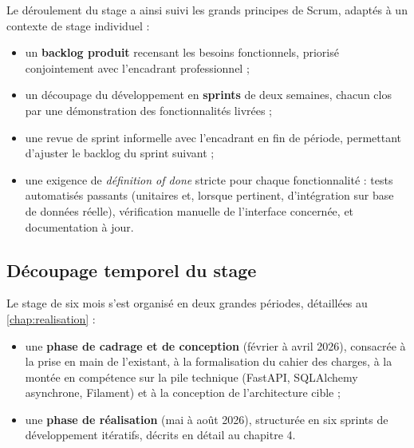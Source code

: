 Le déroulement du stage a ainsi suivi les grands principes de Scrum, adaptés à un contexte de stage individuel :

\begin{itemize}
    \item un \textbf{backlog produit} recensant les besoins fonctionnels, priorisé conjointement avec l'encadrant professionnel ;
    \item un découpage du développement en \textbf{sprints} de deux semaines, chacun clos par une démonstration des fonctionnalités livrées ;
    \item une revue de sprint informelle avec l'encadrant en fin de période, permettant d'ajuster le backlog du sprint suivant ;
    \item une exigence de \emph{définition of done} stricte pour chaque fonctionnalité : tests automatisés passants (unitaires et, lorsque pertinent, d'intégration sur base de données réelle), vérification manuelle de l'interface concernée, et documentation à jour.
\end{itemize}

\subsection{Découpage temporel du stage}

Le stage de six mois s'est organisé en deux grandes périodes, détaillées au \cref{chap:realisation} :

\begin{itemize}
    \item une \textbf{phase de cadrage et de conception} (février à avril 2026), consacrée à la prise en main de l'existant, à la formalisation du cahier des charges, à la montée en compétence sur la pile technique (FastAPI, SQLAlchemy asynchrone, Filament) et à la conception de l'architecture cible ;
    \item une \textbf{phase de réalisation} (mai à août 2026), structurée en six sprints de développement itératifs, décrits en détail au chapitre 4.
\end{itemize}

